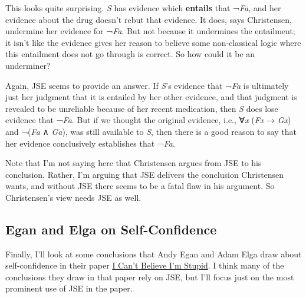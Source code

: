 \documentclass[
  10pt,
  letterpaper,
  DIV=11,
  numbers=noendperiod,
  twoside]{scrartcl}
\begin{document}
This looks quite surprising. \emph{S} has evidence which
\textbf{entails} that ¬\emph{Fa}, and her evidence about the drug
doesn't rebut that evidence. It does, says Christensen, undermine her
evidence for ¬\emph{Fa}. But not because it undermines the entailment;
it isn't like the evidence gives her reason to believe some
non-classical logic where this entailment does not go through is
correct. So how could it be an underminer?

Again, JSE seems to provide an answer. If \emph{S}'s evidence that
¬\emph{Fa} is ultimately just her judgment that it is entailed by her
other evidence, and that judgment is revealed to be unreliable because
of her recent medication, then \emph{S} does lose evidence that
¬\emph{Fa}. But if we thought the original evidence, i.e., ∀\emph{x}
(\emph{Fx} → \emph{Gx}) and ¬(\emph{Fa} ∧ \emph{Ga}), was still
available to \emph{S}, then there is a good reason to say that her
evidence conclusively establishes that ¬\emph{Fa}.

Note that I'm not saying here that Christensen argues from JSE to his
conclusion. Rather, I'm arguing that JSE delivers the conclusion
Christensen wants, and without JSE there seems to be a fatal flaw in his
argument. So Christensen's view needs JSE as well.

\subsection{Egan and Elga on
Self-Confidence}\label{egan-and-elga-on-self-confidence}

Finally, I'll look at some conclusions that Andy Egan and Adam Elga draw
about self-confidence in their paper
\href{http://philsci-archive.pitt.edu/archive/00002432/}{I Can't Believe
I'm Stupid}. I think many of the conclusions they draw in that paper
rely on JSE, but I'll focus just on the most prominent use of JSE in the
paper.
\end{document}
